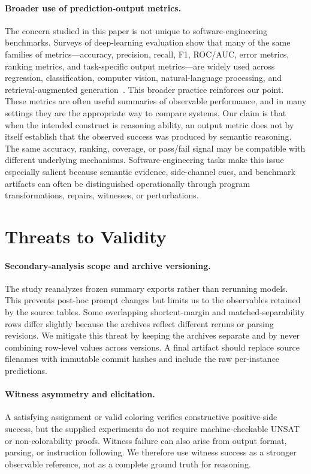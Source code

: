\documentclass[acmsmall,screen,review,anonymous]{acmart}
\newcounter{experiment}
\begin{document}
\paragraph{Broader use of prediction-output metrics.}
The concern studied in this paper is not unique to software-engineering
benchmarks. Surveys of deep-learning evaluation show that many of the same
families of metrics---accuracy, precision, recall, F1, ROC/AUC, error
metrics, ranking metrics, and task-specific output metrics---are widely used
across regression, classification, computer vision, natural-language
processing, and retrieval-augmented generation~\cite{Terven2025LossMetrics}.
This broader practice reinforces our point. These metrics are often useful
summaries of observable performance, and in many settings they are the
appropriate way to compare systems. Our claim is that when the intended
construct is reasoning ability, an output metric does not by itself establish
that the observed success was produced by semantic reasoning. The same
accuracy, ranking, coverage, or pass/fail signal may be compatible with
different underlying mechanisms. Software-engineering tasks make this issue
especially salient because semantic evidence, side-channel cues, and
benchmark artifacts can often be distinguished operationally through program
transformations, repairs, witnesses, or perturbations.

\section{Threats to Validity}
\label{sec:threats}

\paragraph{Secondary-analysis scope and archive versioning.}
The study reanalyzes frozen summary exports rather than rerunning models. This
prevents post-hoc prompt changes but limits us to the observables retained by
the source tables. Some overlapping shortcut-margin and matched-separability
rows differ slightly because
the archives reflect different reruns or parsing revisions. We mitigate this
threat by keeping the archives separate and by never combining row-level
values across versions. A final artifact should replace source filenames with
immutable commit hashes and include the raw per-instance predictions.

\paragraph{Witness asymmetry and elicitation.}
A satisfying assignment or valid coloring verifies constructive positive-side
success, but the supplied experiments do not require machine-checkable UNSAT
or non-colorability proofs. Witness failure can also arise from output format,
parsing, or instruction following. We therefore use witness success as a
stronger observable reference, not as a complete ground truth for reasoning.
\end{document}
